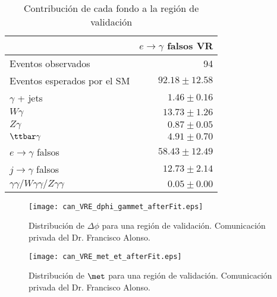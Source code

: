 \begin{table}
\centering
\caption{Contribución de cada fondo a la región de validación}
\begin{tabular}{lr}
\hline
 & $e\to\gamma$ falsos VR \\
\hline
Eventos observados & 94 \\
\hline
Eventos esperados por el SM & $92.18 \pm 12.58$ \\
\hline
$\gamma$ + jets & $1.46 \pm 0.16$ \\
$W\gamma$ & $13.73 \pm 1.26$ \\
$Z\gamma$ & $0.87 \pm 0.05$ \\
$\ttbar\gamma$ & $4.91 \pm 0.70$ \\
$e\rightarrow\gamma$ falsos & $58.43 \pm 12.49$ \\
$j\rightarrow\gamma$ falsos & $12.73 \pm 2.14$ \\
$\gamma\gamma / W\gamma\gamma / Z\gamma\gamma$ & $0.05 \pm 0.00$ \\
\hline
\end{tabular}
\label{ta:vr_events}
\end{table}


\begin{figure}
\centering
\texttt{[image: can\_VRE\_dphi\_gammet\_afterFit.eps]}
\caption{Distribución de $\Delta \phi$ para una región de validación. Comunicación privada del Dr. Francisco Alonso. }
\label{VRE_dphi}
\end{figure}

\begin{figure}
\centering
\texttt{[image: can\_VRE\_met\_et\_afterFit.eps]}
\caption{Distribución de $\met$ para una región de validación. Comunicación privada del Dr. Francisco Alonso. }
\label{VRE_met_et}
\end{figure}
